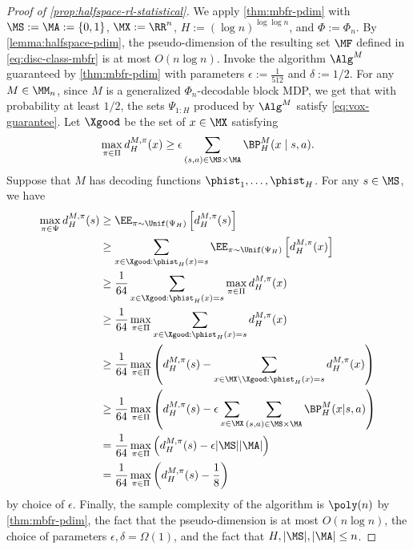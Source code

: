 \begin{proof}[Proof of \cref{prop:halfspace-rl-statistical}]
We apply \cref{thm:mbfr-pdim} with $\MS := \MA := \{0,1\}$, $\MX := \RR^n$, $H := (\log n)^{\log \log n}$, and $\Phi := \Phi_n$. By \cref{lemma:halfspace-pdim}, the pseudo-dimension of the resulting set $\MF$ defined in \cref{eq:disc-class-mbfr} is at most $O(n\log n)$. Invoke the algorithm $\Alg^M$ guaranteed by \cref{thm:mbfr-pdim} with parameters $\epsilon := \frac{1}{512}$ and $\delta := 1/2$. For any $M \in \MM_n$, since $M$ is a generalized $\Phi_n$-decodable block MDP, we get that with probability at least $1/2$, the sets $\Psi_{1:H}$ produced by $\Alg^M$ satisfy \cref{eq:vox-guarantee}. Let $\Xgood$ be the set of $x \in \MX$ satisfying
\[\max_{\pi\in\Pi} d^{M,\pi}_H(x) \geq \epsilon \sum_{(s,a)\in\MS\times\MA} \BP^M_H(x\mid{}s,a).\]
Suppose that $M$ has decoding functions $\phist_1,\dots,\phist_H$. For any $s \in \MS$, we have
\begin{align*}
\max_{\pi\in\Psi} d^{M,\pi}_H(s)
&\geq \EE_{\pi\sim\Unif(\Psi_H)} \left[d^{M,\pi}_H(s) \right]\\ 
&\geq \sum_{x\in\Xgood: \phist_H(x)=s} \EE_{\pi\sim\Unif(\Psi_H)} \left[ d^{M,\pi}_H(x) \right]\\ 
&\geq \frac{1}{64} \sum_{x\in\Xgood: \phist_H(x)=s} \max_{\pi\in\Pi} d^{M,\pi}_H(x) \\ 
&\geq \frac{1}{64} \max_{\pi\in\Pi} \sum_{x\in\Xgood: \phist_H(x)=s} d^{M,\pi}_H(x) \\ 
&\geq \frac{1}{64} \max_{\pi\in\Pi} \left(d^{M,\pi}_H(s) - \sum_{x\in\MX\setminus\Xgood: \phist_H(x)=s} d^{M,\pi}_H(x)\right) \\ 
&\geq \frac{1}{64} \max_{\pi\in\Pi} \left(d^{M,\pi}_H(s) - \epsilon \sum_{x\in\MX} \sum_{(s,a)\in\MS\times\MA} \BP^M_H(x|s,a)\right) \\ 
&= \frac{1}{64} \max_{\pi\in\Pi} \left(d^{M,\pi}_H(s) - \epsilon |\MS||\MA|\right) \\ 
&= \frac{1}{64} \max_{\pi\in\Pi} \left(d^{M,\pi}_H(s) - \frac{1}{8}\right)
\end{align*}
by choice of $\epsilon$. Finally, the sample complexity of the algorithm is $\poly(n)$ by \cref{thm:mbfr-pdim}, the fact that the pseudo-dimension is at most $O(n\log n)$, the choice of parameters $\epsilon,\delta = \Omega(1)$, and the fact that $H,|\MS|,|\MA| \leq n$.
\end{proof}

